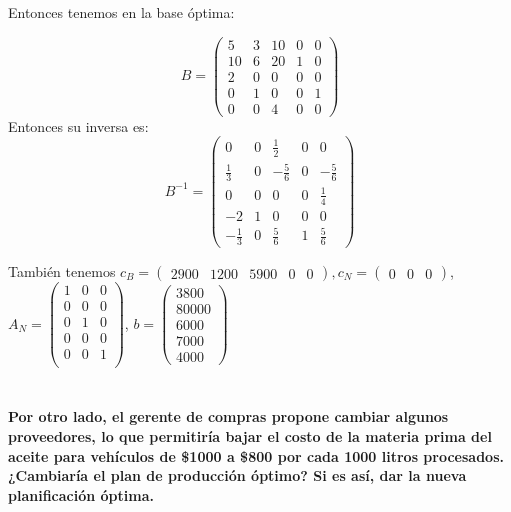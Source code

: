 \documentclass[10pt,a4paper]{article}
\begin{document}
Entonces tenemos en la base óptima:

\[B = \begin{pmatrix}
	5  & 3 & 10 & 0 & 0 \\
	10 & 6 & 20 & 1 & 0 \\
	2  & 0 & 0  & 0 & 0 \\
	0  & 1 & 0  & 0 & 1 \\
	0  & 0 & 4  & 0 & 0
\end{pmatrix}\]
Entonces su inversa es:
\[B^{-1} = \begin{pmatrix}
	0  & 0 &\frac{1}{2} & 0 & 0 \\
	\frac{1}{3} & 0 & -\frac{5}{6} & 0 & -\frac{5}{6} \\
	0  & 0 & 0  & 0 & \frac{1}{4} \\
	-2 & 1 & 0  & 0 & 0 \\
	-\frac{1}{3}  & 0 & \frac{5}{6}  & 1 & \frac{5}{6}
\end{pmatrix}\]

También tenemos $c_B = \begin{pmatrix} 2900 & 1200 & 5900 & 0 & 0 \end{pmatrix}, c_N = \begin{pmatrix} 0 & 0 & 0 \end{pmatrix}$, $A_N = \begin{pmatrix}
	1 & 0 & 0 \\
	0 & 0 & 0 \\
	0 & 1 & 0 \\
	0 & 0 & 0 \\
	0 & 0 & 1 \\
\end{pmatrix}$, $b = \begin{pmatrix}
3800 \\
80000 \\
6000 \\
7000 \\
4000
\end{pmatrix}$

\section{} %
\section{} %
\section{} %
\section{} %
\textbf{Por otro lado, el gerente de compras propone cambiar algunos proveedores, lo que permitiría bajar el costo de la materia prima del aceite para vehículos de \$1000 a \$800 por cada 1000 litros procesados. ¿Cambiaría el plan de producción óptimo? Si es así, dar la nueva planificación óptima.}
\end{document}
